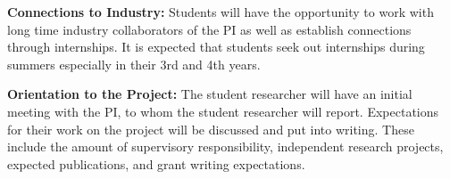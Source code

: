 \noindent\textbf{Connections to Industry: } Students will have the opportunity to work with long time industry collaborators of the PI as well as establish connections through internships. It is expected that students seek out internships during summers especially in their 3rd and 4th years.

\noindent\textbf{Orientation to the Project:} 
The student researcher will have an initial meeting with the PI, to whom the student researcher will report. Expectations for their work on the project will be discussed and put into writing. These include the amount of supervisory responsibility, independent research projects, expected publications, and grant writing expectations. 
